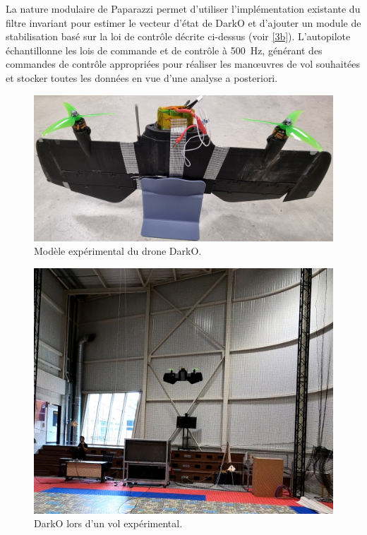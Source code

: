 La nature modulaire de Paparazzi permet d'utiliser l'implémentation existante du filtre invariant pour estimer le vecteur d'état de DarkO et d'ajouter un module de stabilisation basé sur la loi de contrôle décrite ci-dessus (voir \ref{3b}). L'autopilote échantillonne les lois de commande et de contrôle à \SI{500}{\hertz}, générant des commandes de contrôle appropriées pour réaliser les manœuvres de vol souhaitées et stocker toutes les données en vue d'une analyse a posteriori.

\begin{figure}[ht]
    \centering
    \includegraphics[width=0.8\columnwidth]{figures/DarkOModelfinal.jpg}
   \vspace{-0.2cm}\caption{Modèle expérimental du drone DarkO.}
    \label{DarkO1}
\end{figure}
\begin{figure}[ht]
    \centering
    \includegraphics[width=0.8\columnwidth]{figures/DarkOFlighthope.png}
    \vspace{-0.2cm}\caption{DarkO lors d'un vol expérimental.}
    \label{DarkO2}
\end{figure}

